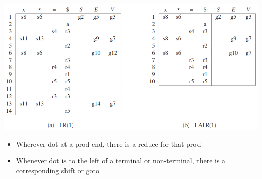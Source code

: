 \includegraphics*[width=\linewidth]{img/LR1_parsing_table}
\begin{itemize}
\item Wherever dot at a prod end, there is a reduce for that prod
\item Whenever dot is to the left of a terminal or non-terminal, there is a corresponding shift or goto
\end{itemize}
